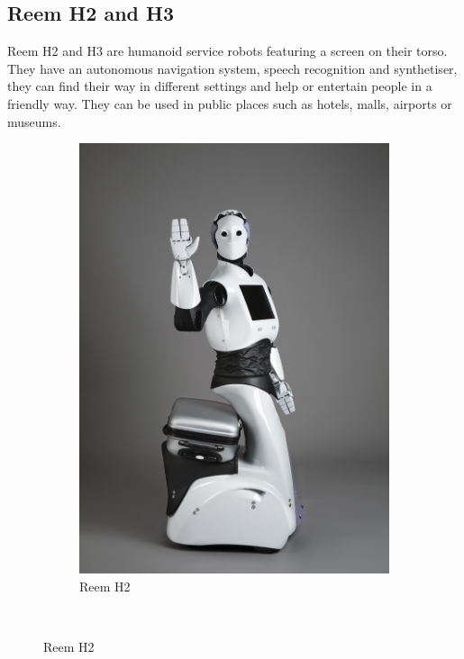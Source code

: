\subsection{Reem H2 and H3}
Reem H2  and H3  are humanoid service robots featuring a screen on their torso.
They have an autonomous navigation system, speech recognition and synthetiser, they can find their way in different settings and help or entertain people in a friendly way.
They can be used in public places such as hotels, malls, airports or museums.

\begin{figure}
   \centering
   \begin{subfigure}[b]{0.3\textwidth}
       \includegraphics[width=\textwidth]{figures/reemh2}
       \caption{Reem H2}
       \label{fig:reemh2}
       \end{subfigure}%
       ~ %

\end{figure}
